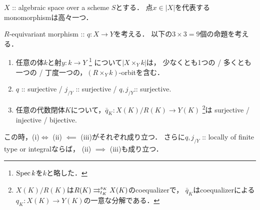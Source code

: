 \begin{Cor}
    $X$ :: algebraic space over a scheme $S$とする．
    点$x \in |X|$を代表するmonomorphismは高々一つ．
\end{Cor}

\begin{Prop}
    $R$-equivariant morphism :: $q \colon X \to Y$を考える．
    以下の$3 \times 3=9$個の命題を考える．
    {\samepage
    \begin{enumerate}
    \item
        任意の体$k$と射$y \colon k \to Y$ \footnote{$\operatorname{Spec} k$を$k$と略した．}
            について$|X \times_{Y} k|$は，\mnewline
        少なくとも1つの / 多くとも一つの / 丁度一つの，$(R \times_{Y} k)$-orbitを含む．
    \item
        $q$ :: surjective / $j_{/Y}$ :: surjective / $q, j_{/Y}$:: surjective.
    \item
        任意の代数閉体$K$について，$\bar{q}_K \colon X(K)/R(K) \to Y(K)$
        \footnote
            {
                $X(K)/R(K)$は$R(K) \mathrel{\mathop{\rightrightarrows}^{s_K}_{t_K}} X(K)$のcoequalizerで，
                $\bar{q}_K$はcoequalizerによる$q_K \colon X(K) \to Y(K)$の一意な分解である．
            }は \mnewline
        surjective / injective / bijective.
    \end{enumerate}
    }

    この時，(i)$ \iff$ (ii) $\impliedby$ (iii)がそれぞれ成り立つ．
    さらに$q, j_{/Y}$ :: locally of finite type or integralならば，
    (ii) $\implies$ (iii)も成り立つ．
\end{Prop}

